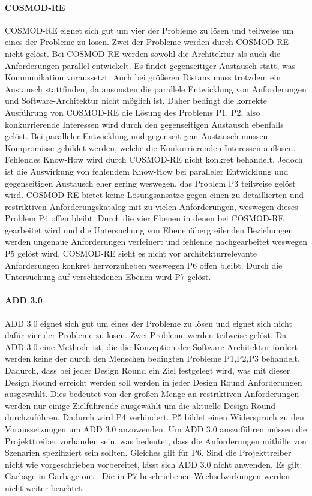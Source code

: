 \paragraph{COSMOD-RE}
COSMOD-RE eignet sich gut um vier der Probleme zu lösen und teilweise um eines der Probleme zu lösen. Zwei der Probleme werden durch COSMOD-RE nicht gelöst. Bei COSMOD-RE werden sowohl die Architektur als auch die Anforderungen parallel entwickelt. Es findet gegenseitiger Austausch statt, was Kommunikation voraussetzt. Auch bei größeren Distanz muss trotzdem ein Austausch stattfinden, da ansonsten die parallele Entwicklung von Anforderungen und Software-Architektur nicht möglich ist. Daher bedingt die korrekte Ausführung von COSMOD-RE die Lösung des Problems P1. P2, also konkurrierende Interessen wird durch den gegenseitigen Austausch ebenfalls gelöst. Bei paralleler Entwicklung und gegenseitigem Austausch müssen Kompromisse gebildet werden, welche die Konkurrierenden Interessen auflösen. Fehlendes Know-How wird durch COSMOD-RE nicht konkret behandelt. Jedoch ist die Auswirkung von fehlendem Know-How bei paralleler Entwicklung und gegenseitigen Austausch eher gering weswegen, das Problem P3 teilweise gelöst wird. COSMOD-RE bietet keine Lösungsansätze gegen einen zu detaillierten und restriktiven Anforderungskatalog mit zu vielen Anforderungen, weswegen dieses Problem P4 offen bleibt. Durch die vier Ebenen in denen bei COSMOD-RE gearbeitet wird und die Untersuchung von Ebenenübergreifenden Beziehungen werden ungenaue Anforderungen verfeinert und fehlende nachgearbeitet weswegen P5 gelöst wird. COSMOD-RE sieht es nicht vor architekturrelevante Anforderungen konkret hervorzuheben weswegen P6 offen bleibt. Durch die Untersuchung auf verschiedenen Ebenen wird P7 gelöst.\\

\paragraph{ADD 3.0}
ADD 3.0 eignet sich gut um eines der Probleme zu lösen und eignet sich nicht dafür vier der Probleme zu lösen. Zwei Probleme werden teilweise gelöst. Da ADD 3.0 eine Methode ist, die die Konzeption der Software-Architektur fördert werden keine der durch den Menschen bedingten Probleme P1,P2,P3 behandelt. Dadurch, dass bei jeder Design Round ein Ziel festgelegt wird, was mit dieser Design Round erreicht werden soll werden in jeder Design Round Anforderungen ausgewählt. Dies bedeutet von der großen Menge an restriktiven Anforderungen werden nur einige Zielführende ausgewählt um die aktuelle Design Round durchzuführen. Dadurch wird P4 verhindert. P5 bildet einen Widerspruch zu den Voraussetzungen um ADD 3.0 anzuwenden. Um ADD 3.0 auszuführen müssen die Projekttreiber vorhanden sein, was bedeutet, dass die Anforderungen mithilfe von Szenarien spezifiziert sein sollten. Gleiches gilt für P6. Sind die Projekttreiber nicht wie vorgeschrieben vorbereitet, lässt sich ADD 3.0 nicht anwenden. Es gilt: Garbage in Garbage out \cite{Cer01}. Die in P7 beschriebenen Wechselwirkungen werden nicht weiter beachtet.\\